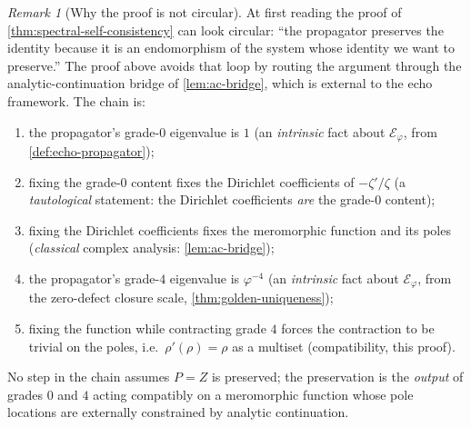 \documentclass[11pt,a4paper]{article}
\theoremstyle{plain}
\theoremstyle{definition}
\theoremstyle{remark}
\newtheorem{remark}[theorem]{Remark}
\numberwithin{equation}{section}
\providecommand{\vp}{\varphi}
\providecommand{\EF}{\mathcal{E}}
\begin{document}
\begin{remark}[Why the proof is not circular]
\label{rmk:why-not-circular}
At first reading the proof of
\cref{thm:spectral-self-consistency} can look circular: ``the
propagator preserves the identity because it is an endomorphism
of the system whose identity we want to preserve.''  The proof
above avoids that loop by routing the argument through the
analytic-continuation bridge of \cref{lem:ac-bridge}, which is
external to the echo framework.  The chain is:
\begin{enumerate}
  \item the propagator's grade-$0$ eigenvalue is $1$ (an
    \emph{intrinsic} fact about $\EF_\vp$, from
    \cref{def:echo-propagator});
  \item fixing the grade-$0$ content fixes the Dirichlet
    coefficients of $-\zeta'/\zeta$ (a \emph{tautological}
    statement: the Dirichlet coefficients \emph{are} the grade-$0$
    content);
  \item fixing the Dirichlet coefficients fixes the meromorphic
    function and its poles (\emph{classical} complex analysis:
    \cref{lem:ac-bridge});
  \item the propagator's grade-$4$ eigenvalue is $\vp^{-4}$ (an
    \emph{intrinsic} fact about $\EF_\vp$, from the zero-defect
    closure scale, \cref{thm:golden-uniqueness});
  \item fixing the function while contracting grade $4$ forces
    the contraction to be trivial on the poles, i.e.\
    $\rho'(\rho) = \rho$ as a multiset (compatibility, this
    proof).
\end{enumerate}
No step in the chain assumes $P = Z$ is preserved; the
preservation is the \emph{output} of grades $0$ and $4$ acting
compatibly on a meromorphic function whose pole locations are
externally constrained by analytic continuation.
\end{remark}
\end{document}
